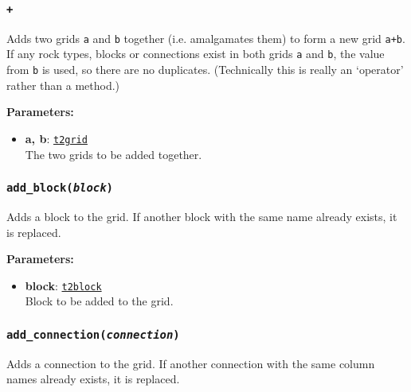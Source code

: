 \begin{snugshade}
\subsubsection{\texttt{+}}
\end{snugshade}
\label{sec:t2grid:plus}

Adds two grids \texttt{a} and \texttt{b} together (i.e. amalgamates them) to form a new grid \texttt{a+b}.  If any rock types, blocks or connections exist in both grids \texttt{a} and \texttt{b}, the value from \texttt{b} is used, so there are no duplicates.  (Technically this is really an `operator' rather than a method.)

\textbf{Parameters:}
\begin{itemize}
\item \textbf{a, b}: \hyperref[t2grids]{\texttt{t2grid}}\\
  The two grids to be added together.
\end{itemize}

\begin{snugshade}
\subsubsection{\texttt{add\_block(\emph{block})}}
\end{snugshade}
\label{sec:t2grid:add_block}

Adds a block to the grid.  If another block with the same name already exists, it is replaced.

\textbf{Parameters:}
\begin{itemize}
\item \textbf{block}: \hyperref[t2blockobjects]{\texttt{t2block}}\\
  Block to be added to the grid.
\end{itemize}

\begin{snugshade}
\subsubsection{\texttt{add\_connection(\emph{connection})}}
\end{snugshade}
\label{sec:t2grid:add_connection}

Adds a connection to the grid.  If another connection with the same column names already exists, it is replaced.

